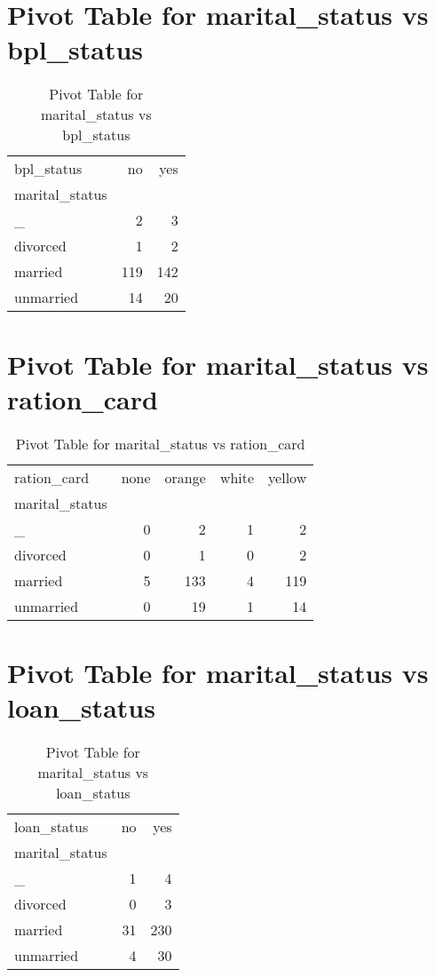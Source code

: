 \documentclass{article}
\begin{document}
\section{Pivot Table for marital_status vs bpl_status}
\begin{table}
\caption{Pivot Table for marital_status vs bpl_status}
\label{tab:marital_status_bpl_status}
\begin{tabular}{lrr}
\toprule
bpl_status & no & yes \\
marital_status &  &  \\
\midrule
\_ & 2 & 3 \\
divorced & 1 & 2 \\
married & 119 & 142 \\
unmarried & 14 & 20 \\
\bottomrule
\end{tabular}
\end{table}

\section{Pivot Table for marital_status vs ration_card}
\begin{table}
\caption{Pivot Table for marital_status vs ration_card}
\label{tab:marital_status_ration_card}
\begin{tabular}{lrrrr}
\toprule
ration_card & none & orange & white & yellow \\
marital_status &  &  &  &  \\
\midrule
\_ & 0 & 2 & 1 & 2 \\
divorced & 0 & 1 & 0 & 2 \\
married & 5 & 133 & 4 & 119 \\
unmarried & 0 & 19 & 1 & 14 \\
\bottomrule
\end{tabular}
\end{table}

\section{Pivot Table for marital_status vs loan_status}
\begin{table}
\caption{Pivot Table for marital_status vs loan_status}
\label{tab:marital_status_loan_status}
\begin{tabular}{lrr}
\toprule
loan_status & no & yes \\
marital_status &  &  \\
\midrule
\_ & 1 & 4 \\
divorced & 0 & 3 \\
married & 31 & 230 \\
unmarried & 4 & 30 \\
\bottomrule
\end{tabular}
\end{table}
\end{document}
